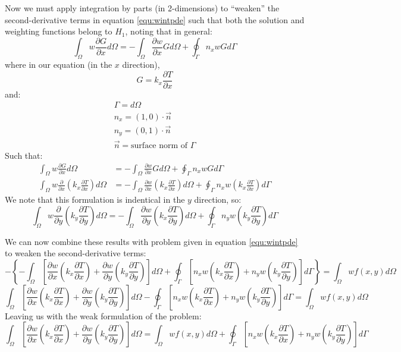 \documentclass[letterpaper,10pt]{article}
\begin{document}
Now we must apply integration by parts (in 2-dimensions) to ``weaken'' the second-derivative terms in equation \ref{equ:wintpde} such that both the solution and weighting functions belong to $H_1$, noting that in general:
\[\int_\Omega w \frac{\partial G}{\partial x}d\Omega = -\int_\Omega \frac{\partial w}{\partial x}Gd\Omega + \oint_\Gamma n_xwGd\Gamma\]
\noindent where in our equation (in the $x$ direction),
\[G = k_x\frac{\partial T}{\partial x}\]
\noindent and:
\[\begin{array}{l}
\Gamma = d\Omega \\
n_x = \left(1,0\right) \cdot \vec{n} \\
n_y = \left(0,1\right) \cdot \vec{n} \\
\vec{n} = \text{surface norm of } \Gamma
\end{array}\]
Such that:
\[\begin{split}
	\int_\Omega w \frac{\partial G}{\partial x}d\Omega &= -\int_\Omega \frac{\partial w}{\partial x}Gd\Omega + \oint_\Gamma n_xwGd\Gamma \\
	\int_\Omega w \frac{\partial}{\partial x}\left(k_x\frac{\partial T}{\partial x}\right)d\Omega &= -\int_\Omega \frac{\partial w}{\partial x}\left(k_x\frac{\partial T}{\partial x}\right)d\Omega + \oint_\Gamma n_xw\left(k_x\frac{\partial T}{\partial x}\right)d\Gamma
\end{split}\]
\noindent We note that this formulation is indentical in the $y$ direction, so:
\[\int_\Omega w \frac{\partial}{\partial y}\left(k_y\frac{\partial T}{\partial y}\right)d\Omega = -\int_\Omega \frac{\partial w}{\partial y}\left(k_x\frac{\partial T}{\partial y}\right)d\Omega + \oint_\Gamma n_yw\left(k_y\frac{\partial T}{\partial y}\right)d\Gamma\]

We can now combine these results with problem given in equation \ref{equ:wintpde} to weaken the second-derivative terms:
\[-\left\{-\int_\Omega \left[\frac{\partial w}{\partial x}\left(k_x\frac{\partial T}{\partial x}\right) + \frac{\partial w}{\partial y}\left(k_y\frac{\partial T}{\partial y}\right) \right]d\Omega + \oint_\Gamma \left[n_xw\left(k_x\frac{\partial T}{\partial x}\right) + n_yw\left(k_y\frac{\partial T}{\partial y}\right)\right]d\Gamma\right\} = \int_\Omega wf(x,y)d\Omega\]
\[\int_\Omega \left[\frac{\partial w}{\partial x}\left(k_x\frac{\partial T}{\partial x}\right) + \frac{\partial w}{\partial y}\left(k_y\frac{\partial T}{\partial y}\right) \right]d\Omega - \oint_\Gamma \left[n_xw\left(k_x\frac{\partial T}{\partial x}\right) + n_yw\left(k_y\frac{\partial T}{\partial y}\right)\right]d\Gamma = \int_\Omega wf(x,y)d\Omega\]
\noindent Leaving us with the weak formulation of the problem:
\begin{equation}
\label{equ:weak}
\boxed{\int_\Omega \left[\frac{\partial w}{\partial x}\left(k_x\frac{\partial T}{\partial x}\right) + \frac{\partial w}{\partial y}\left(k_y\frac{\partial T}{\partial y}\right) \right]d\Omega = \int_\Omega wf(x,y)d\Omega + \oint_\Gamma \left[n_xw\left(k_x\frac{\partial T}{\partial x}\right) + n_yw\left(k_y\frac{\partial T}{\partial y}\right)\right]d\Gamma}
\end{equation}
\end{document}
